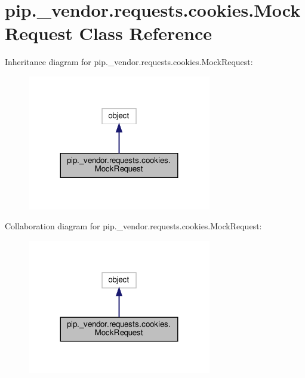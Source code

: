 \hypertarget{classpip_1_1__vendor_1_1requests_1_1cookies_1_1MockRequest}{}\section{pip.\+\_\+vendor.\+requests.\+cookies.\+Mock\+Request Class Reference}
\label{classpip_1_1__vendor_1_1requests_1_1cookies_1_1MockRequest}


Inheritance diagram for pip.\+\_\+vendor.\+requests.\+cookies.\+Mock\+Request\+:
\nopagebreak
\begin{figure}[H]
\begin{center}
\leavevmode
\includegraphics[width=227pt]{classpip_1_1__vendor_1_1requests_1_1cookies_1_1MockRequest__inherit__graph}
\end{center}
\end{figure}


Collaboration diagram for pip.\+\_\+vendor.\+requests.\+cookies.\+Mock\+Request\+:
\nopagebreak
\begin{figure}[H]
\begin{center}
\leavevmode
\includegraphics[width=227pt]{classpip_1_1__vendor_1_1requests_1_1cookies_1_1MockRequest__coll__graph}
\end{center}
\end{figure}

